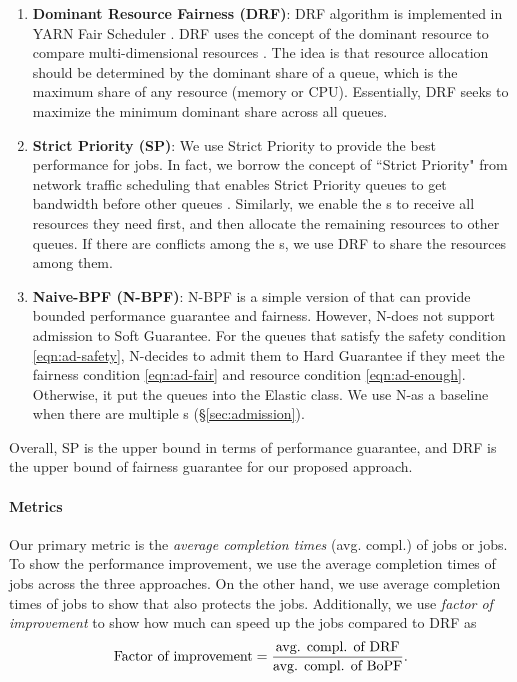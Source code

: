 \begin{enumerate}

\item \textbf{ Dominant Resource Fairness (DRF)}: DRF algorithm is implemented in YARN Fair Scheduler \cite{hadoop-fair-scheduler}.
DRF uses the concept of the dominant resource to compare multi-dimensional resources \cite{drf}.
The idea is that resource allocation should be determined by the dominant share of a queue, which is the maximum share of any resource (memory or CPU). Essentially, DRF seeks to maximize the minimum dominant share across all queues.

\item \textbf{Strict Priority (SP)}: We use Strict Priority to provide the best performance for \burstq jobs.
In fact, we borrow the concept of ``Strict Priority" from network traffic scheduling that enables Strict Priority queues to get bandwidth before other queues \cite{strict_priority}.
Similarly, we enable the {\burstq}s to receive all resources they need first, and then allocate the remaining resources to other queues. If there are conflicts among the {\burstq}s, we use DRF to share the resources among them.

\item \textbf{Naive-BPF (N-BPF)}: N-BPF is a simple version of \name that can provide bounded performance guarantee and fairness.
However, N-\name does not support admission to Soft Guarantee.
For the queues that satisfy the safety condition \ref{eqn:ad-safety}, N-\name decides to admit them to Hard Guarantee if they meet the fairness condition \ref{eqn:ad-fair} and resource condition \ref{eqn:ad-enough}.
Otherwise, it put the queues into the Elastic class. We use N-\name as a baseline when there are multiple {\burstq}s (\S\ref{sec:admission}).

\end{enumerate}
Overall, SP is the upper bound in terms of performance guarantee, and DRF is the upper bound of fairness guarantee for our proposed approach.

\paragraph{Metrics} Our primary metric is the \emph{average completion times} (avg. compl.) of \burstq jobs or \batchq jobs.
To show the performance improvement, we use the average completion times of \burstq jobs across the three approaches.
On the other hand, we use average completion times of \batchq jobs to show that \name also protects the \batchq jobs.
Additionally, we use \emph{factor of improvement} to show how much \name can speed up the \burstq jobs compared to DRF as
$$ \text{Factor of improvement} = \frac{\text{avg. compl. of DRF}}{\text{avg. compl. of BoPF}}. $$


